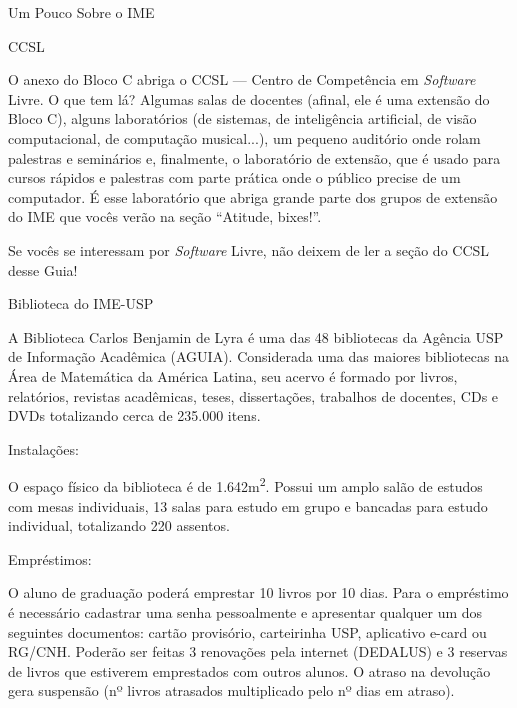 \begin{secao}{Um Pouco Sobre o IME}
\begin{subsecao}{CCSL}

O anexo do Bloco C abriga o CCSL --- Centro de Competência em \textit{Software}
Livre. O que tem lá? Algumas salas de docentes (afinal, ele é uma extensão do
Bloco C), alguns laboratórios (de sistemas, de inteligência artificial,
de visão computacional, de computação musical...), um pequeno auditório
onde rolam palestras e seminários e, finalmente, o laboratório de extensão,
que é usado para cursos rápidos e palestras com parte prática onde o público
precise de um computador. É esse laboratório que abriga grande parte dos grupos
de extensão do IME que vocês verão na seção ``Atitude, bixes!''.

Se vocês se interessam por \textit{Software} Livre, não deixem de ler a seção
do CCSL desse Guia!

\end{subsecao}

\begin{subsecao}{Biblioteca do IME-USP}

A Biblioteca Carlos Benjamin de Lyra é uma das 48 bibliotecas da Agência USP de Informação Acadêmica (AGUIA). Considerada uma das maiores bibliotecas na Área de Matemática da América Latina, seu acervo é formado por livros, relatórios, revistas acadêmicas, teses, dissertações, trabalhos de docentes, CDs e DVDs totalizando cerca de 235.000 itens. 

\begin{subsubsecao}{Instalações:}

O espaço físico da biblioteca é de 1.642m\textsuperscript{2}. Possui um amplo salão de estudos com mesas individuais, 13 salas para estudo em grupo e bancadas para estudo individual, totalizando 220 assentos.
\end{subsubsecao}

\begin{subsubsecao}{Empréstimos:}

O aluno de graduação poderá emprestar 10 livros por 10 dias. Para o empréstimo é necessário cadastrar uma senha pessoalmente e apresentar qualquer um dos seguintes documentos: cartão provisório, carteirinha USP, aplicativo e-card ou RG/CNH. Poderão ser feitas 3 renovações pela internet (DEDALUS) e 3 reservas de livros que estiverem emprestados com outros alunos. O atraso na devolução gera suspensão (nº livros atrasados multiplicado pelo nº dias em atraso). 
\end{subsubsecao}

\pagebreak


\end{subsecao}
\end{secao}
